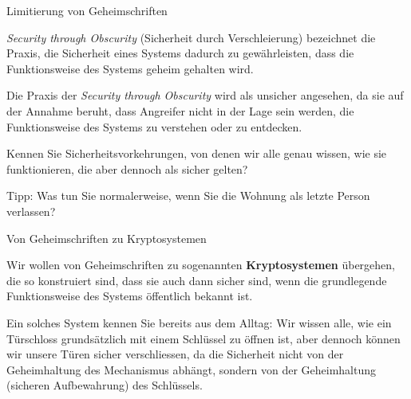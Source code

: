 \begin{frame}{Limitierung von Geheimschriften}
    \begin{myremark}
    \emph{Security through Obscurity} (Sicherheit durch Verschleierung) bezeichnet die Praxis, die Sicherheit eines Systems dadurch zu gewährleisten, dass die Funktionsweise des Systems geheim gehalten wird. \hfill\par
    \vspace{\baselineskip}
    Die Praxis der \emph{Security through Obscurity} wird als unsicher angesehen, da sie auf der Annahme beruht, dass Angreifer nicht in der Lage sein werden, die Funktionsweise des Systems zu verstehen oder zu entdecken.
    \end{myremark}
\end{frame}


\begin{frame}
    \begin{center}
        Kennen Sie Sicherheitsvorkehrungen, von denen wir alle genau wissen, wie sie funktionieren, die aber dennoch als sicher gelten? \\
    
        \pause
        \hfill\par
        \vspace{\baselineskip}
        Tipp: Was tun Sie normalerweise, wenn Sie die Wohnung als letzte Person verlassen?
    \end{center}
\end{frame}


\begin{frame}{Von Geheimschriften zu Kryptosystemen}
    \begin{myidea}[Kryptosystem]
        Wir wollen von Geheimschriften zu sogenannten \textbf{Kryptosystemen} übergehen, die so konstruiert sind, dass sie auch dann sicher sind, wenn die grundlegende Funktionsweise des Systems öffentlich bekannt ist. \hfill\par
        \vspace{\baselineskip}
        Ein solches System kennen Sie bereits aus dem Alltag: Wir wissen alle, wie ein Türschloss grundsätzlich mit einem Schlüssel zu öffnen ist, aber dennoch können wir unsere Türen sicher verschliessen, da die Sicherheit nicht von der Geheimhaltung des Mechanismus abhängt, sondern von der Geheimhaltung (sicheren Aufbewahrung) des Schlüssels.
    \end{myidea}
\end{frame}


